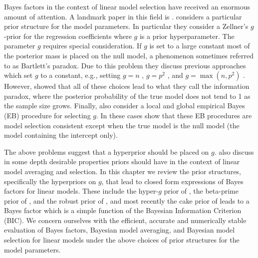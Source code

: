 Bayes factors in the context of linear model selection 
\citep{Zellner1980,
	Zellner1980b,
	Mitchell1988,
	George1993,
	Fernandez2001,
	Liang2008,
	Maruyama2011,
	Bayarri2012}
have received an enormous amount of attention. A landmark paper in this field
is \cite{Liang2008}.  \cite{Liang2008} considers a particular prior structure
for the model parameters.  In particular they consider a Zellner's $g$-prior
\citep{Zellner1980,Zellner1986} for the regression coefficients where $g$ is a
prior hyperparameter. The parameter $g$ requires special consideration. If $g$
is set to a large constant most of the posterior mass is placed on the null
model, a phenomenon sometimes referred to as Bartlett's paradox.  Due to this
problem they discuss previous approaches which set $g$ to a constant, e.g.,
setting $g=n$ \citep{Kass1995b},  $g=p^2$ \citep{Foster1994}, and
$g=\max(n,p^2)$ \citep{Fernandez2001}. However, \cite{Liang2008} showed that
all of these choices lead to what they call the information paradox, where the
posterior probability of the true model does not tend to 1 as the sample size
grows. Finally, \cite{Liang2008} also consider a local and global empirical
Bayes (EB) procedure for selecting $g$. In these cases \cite{Liang2008} show
that these EB procedures are model selection consistent except when the true
model is the null model (the model containing the intercept only). 

The above problems suggest that a hyperprior should be placed on $g$.
\cite{Bayarri2012} also discuss in some depth desirable properties priors
should have in the context of linear model averaging and selection.  In this
chapter we review the prior structures, specifically the hyperpriors on $g$,
that lead to closed form expressions of Bayes factors for linear models.  These
include the hyper-$g$ prior of \cite{Liang2008}, the beta-prime prior of
\cite{Maruyama2011}, and the robust prior of \cite{Bayarri2012}, and most
recently the cake prior of \cite{OrmerodEtal2017} leads to a Bayes factor which
is a simple function of the Bayesian Information Criterion (BIC). We concern
ourselves with the efficient, accurate and numerically stable evaluation of
Bayes factors, Bayesian model averaging, and Bayesian model selection  for
linear models under the above choices of prior structures for the model
parameters.


